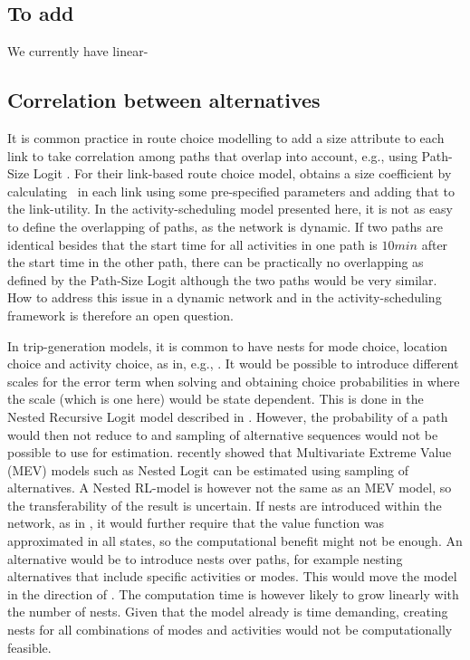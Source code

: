\subsection{To add}

We currently have linear-


\subsection{Correlation between alternatives}
It is common practice in route choice modelling to add a size attribute to each link to take correlation among paths that overlap into account, e.g., using Path-Size Logit \citep{BenAkivaBier99}. For their link-based route choice model, \citet{fosgerau11} obtains a size coefficient by calculating \eutil\, in each link using some pre-specified parameters and adding that to the link-utility. In the activity-scheduling model presented here, it is not as easy to define the overlapping of paths, as the network is dynamic. If two paths are identical besides that the start time for all activities in one path is $10\unit{min}$ after the start time in the other path, there can be practically no overlapping as defined by the Path-Size Logit although the two paths would be very similar. How to address this issue in a dynamic network and in the activity-scheduling framework is therefore an open question.

In trip-generation models, it is common to have nests for mode choice, location choice and activity choice, as in, e.g., \citet{Bowman01}. It would be possible to introduce different scales for the error term when solving  and obtaining choice probabilities in  where the scale (which is one here) would be state dependent. This is done in the Nested Recursive Logit model described in \citet{mai2015}. However, the probability of a path would then not reduce to   and sampling of alternative sequences would not be possible to use for estimation.
\citet{guevara2013MEV} recently showed that Multivariate Extreme Value (MEV) models such as Nested Logit can be estimated using sampling of alternatives. A Nested RL-model is however not the same as an MEV model, so the transferability of the result is uncertain. If nests are introduced within the network, as in \citet{mai2015}, it would further require that the value function was approximated in all states, so the computational benefit might not be enough. An alternative would be to introduce nests over paths, for example nesting alternatives that include specific activities or modes. This would move the model in the direction of \citet{Bowman01}. The computation time is however likely to grow linearly with the number of nests. Given that the model already is time demanding, creating nests for all combinations of modes and activities would not be computationally feasible.

